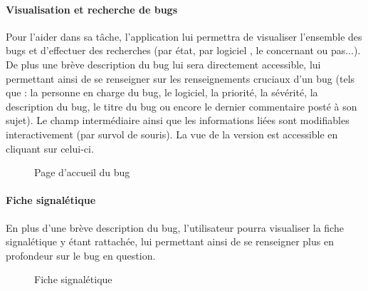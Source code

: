 \documentclass{article}[12pt]
\begin{document}
\paragraph{Visualisation et recherche de bugs}
 Pour l'aider dans sa tâche, l'application lui permettra de visualiser l'ensemble des bugs et d'effectuer des recherches (par état, par logiciel , le concernant ou pas...).
 De plus une brève description du bug lui sera directement accessible, lui permettant ainsi de se renseigner sur les renseignements cruciaux d'un bug (tels que  : la personne en charge du bug, le logiciel, la priorité, la sévérité, la description du bug, le titre du bug ou encore le dernier commentaire posté à son sujet). Le champ intermédiaire ainsi que les informations liées sont modifiables interactivement (par survol de souris). La vue de la version est accessible en cliquant sur celui-ci.
 
 \begin{figure}[H]
 	\centering
    \caption{Page d'accueil du bug}
 \end{figure}
 
 \paragraph{Fiche signalétique}
 En plus d'une brève description du bug, l'utilisateur pourra visualiser la fiche signalétique y étant rattachée, lui permettant ainsi de se renseigner plus en profondeur sur le bug en question. 
 
\begin{figure}[H]
	\centering
    \caption{Fiche signalétique}
\end{figure}
\end{document}
